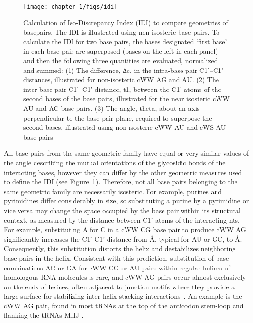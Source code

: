 \begin{figure}
  \texttt{[image: chapter-1/figs/idi]}
  \caption{Calculation of Iso-Discrepancy Index (IDI) to compare geometries of
    basepairs. The IDI is illustrated using non-isosteric base pairs. To
    calculate the IDI for two base pairs, the bases designated ‘first base’ in
    each base pair are superposed (bases on the left in each panel) and then the
    following three quantities are evaluated, normalized and summed: (1) The
    difference, ∆c, in the intra-base pair C1’–C1’ distances, illustrated for
    non-isosteric cWW AG and AU\@. (2) The inter-base pair C1’–C1’ distance, t1,
    between the C1’ atoms of the second bases of the base pairs, illustrated for
    the near isosteric cWW AU and AC base pairs. (3) The angle, theta, about an
    axis perpendicular to the base pair plane, required to superpose the second
  bases, illustrated using non-isosteric cWW AU and cWS AU base pairs.}
\label{fig:idi}
\end{figure}

All base pairs from the same geometric family have equal or very similar values
of the angle describing the mutual orientations of the glycosidic bonds of the
interacting bases, however they can differ by the other geometric measures used
to define the IDI (see Figure~\ref{fig:idi}). Therefore, not all base pairs belonging to
the same geometric family are necessarily isosteric. For example, purines and
pyrimidines differ considerably in size, so substituting a purine by a
pyrimidine or vice versa may change the space occupied by the base pair within
its structural context, as measured by the distance between C1' atoms of the
interacting nts. For example, substituting A for C in a cWW CG base pair to
produce cWW AG significantly increases the C1'-C1' distance from  \AA,
typical for AU or GC, to  \AA\@. Consequently, this substitution distorts the
helix and destabilizes neighboring base pairs in the helix. Consistent with this
prediction, substitution of base combinations AG or GA for cWW CG or AU pairs
within regular helices of homologous RNA molecules is rare, and cWW AG pairs
occur almost exclusively on the ends of helices, often adjacent to junction
motifs where they provide a large surface for stabilizing inter-helix stacking
interactions~\cite{Sponer2003}. An example is the cWW AG pair, found in most
tRNAs at the top of the anticodon stem-loop and flanking the tRNAs MHJ
\cite{Romby1985}.


